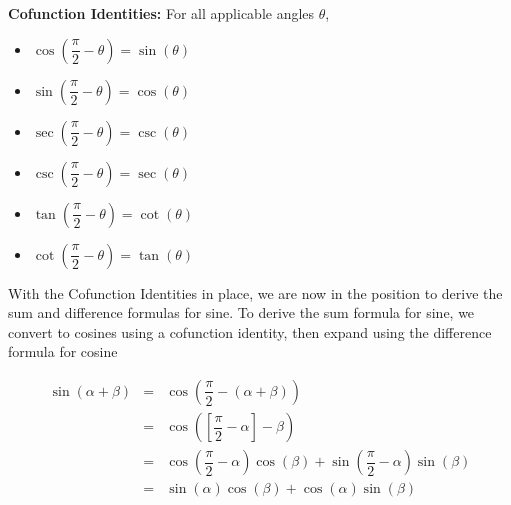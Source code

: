\colorbox{ResultColor}{\bbm

\begin{thm} \label{cofunctionidentities}  \textbf{Cofunction Identities:} For all applicable angles $\theta$, 

\begin{multicols}{3}

\begin{itemize}

\item  $\cos\left(\dfrac{\pi}{2} - \theta \right) = \sin(\theta)$

\item  $\sin\left(\dfrac{\pi}{2} - \theta \right) = \cos(\theta)$

\item  $\sec\left(\dfrac{\pi}{2} - \theta \right) = \csc(\theta)$

\item  $\csc\left(\dfrac{\pi}{2} - \theta \right) = \sec(\theta)$

\item  $\tan\left(\dfrac{\pi}{2} - \theta \right) = \cot(\theta)$

\item  $\cot\left(\dfrac{\pi}{2} - \theta \right) = \tan(\theta)$

\end{itemize}

\end{multicols}

\end{thm}

\vspace{.01in}

\ebm}

\medskip

With the Cofunction Identities in place, we are now in the position to derive the sum and difference formulas for sine.  To derive the sum formula for sine, we convert to cosines using a cofunction identity, then expand using the difference formula for cosine

\[ \begin{array}{rcl}

\sin(\alpha + \beta) & = & \cos\left( \dfrac{\pi}{2} - (\alpha + \beta) \right) \\ [10pt]
                     & = & \cos\left( \left[\dfrac{\pi}{2} - \alpha \right] - \beta \right) \\ [10pt]
                     & = & \cos\left(\dfrac{\pi}{2} - \alpha \right) \cos(\beta) + \sin\left(\dfrac{\pi}{2} - \alpha \right)\sin(\beta) \\ [10pt]
                     & = & \sin(\alpha) \cos(\beta) + \cos(\alpha) \sin(\beta) \\ \end{array} \]


